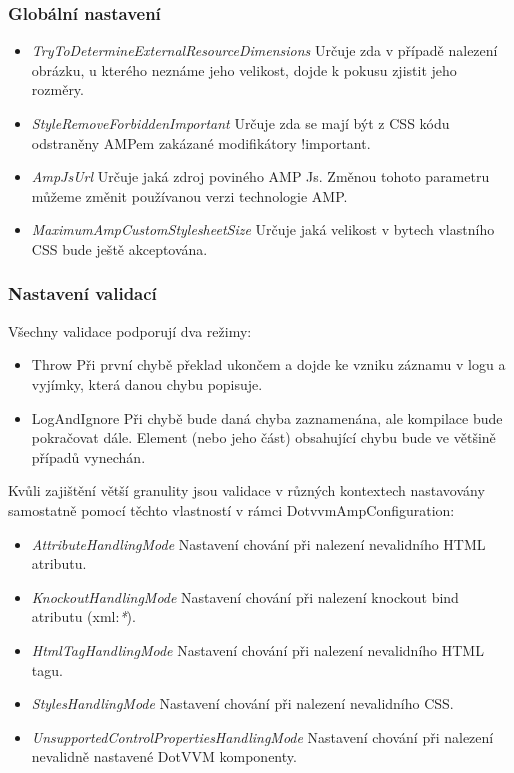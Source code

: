 \subsubsection{Globální nastavení}
\begin{itemize}
    \item \textit{TryToDetermineExternalResourceDimensions} \newline
    Určuje zda v případě nalezení obrázku, u kterého neznáme jeho velikost, dojde k pokusu zjistit jeho rozměry.
    \item \textit{StyleRemoveForbiddenImportant}\newline
    Určuje zda se mají být z CSS kódu odstraněny AMPem zakázané modifikátory !important.
    \item \textit{AmpJsUrl}\newline
    Určuje jaká zdroj poviného AMP Js. Změnou tohoto parametru můžeme změnit používanou verzi technologie AMP.
    \item \textit{MaximumAmpCustomStylesheetSize}\newline
    Určuje jaká velikost v bytech vlastního CSS bude ještě akceptována.
\end{itemize}


\subsubsection{Nastavení validací} \label{validationModes}
Všechny validace podporují dva režimy:
\begin{itemize}
    \item Throw \newline
    Při první chybě překlad ukončem a dojde ke vzniku záznamu v logu a vyjímky, která danou chybu popisuje.
    \item LogAndIgnore \newline
    Při chybě bude daná chyba zaznamenána, ale kompilace bude pokračovat dále. Element (nebo jeho část) obsahující chybu bude ve většině případů vynechán.
\end{itemize}
Kvůli zajištění větší granulity jsou validace v různých kontextech nastavovány samostatně pomocí těchto vlastností v rámci DotvvmAmpConfiguration: 
\begin{itemize}
    \item \textit{AttributeHandlingMode} \newline
    Nastavení chování při nalezení nevalidního HTML atributu.
    \item \textit{KnockoutHandlingMode}\newline
    Nastavení chování při nalezení knockout bind atributu (xml:\textit{*}).
    \item \textit{HtmlTagHandlingMode}\newline
    Nastavení chování při nalezení nevalidního HTML tagu.
    \item \textit{StylesHandlingMode}\newline
    Nastavení chování při nalezení nevalidního CSS.
    \item \textit{UnsupportedControlPropertiesHandlingMode}\newline
    Nastavení chování při nalezení nevalidně nastavené DotVVM komponenty.
\end{itemize}

